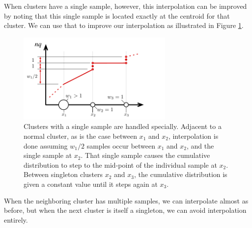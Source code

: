 \documentclass[]{statsoc}
\begin{document}
When clusters have a single sample, however, this interpolation can be improved by noting that this single sample is located exactly at the centroid for that cluster. We can use that to improve our interpolation as illustrated in Figure \ref{fig:singletons}. 
\begin{figure}[tb] %
   \centering
   \includegraphics[width=3in]{quantile-figures/singleton.pdf} 
   \caption{Clusters with a single sample are handled specially. Adjacent to a normal cluster, as is the case between $x_1$ and $x_2$, interpolation is done assuming $w_1/2$ samples occur between $x_1$ and $x_2$, and the single sample at $x_2$. That single sample causes the cumulative distribution to step to the mid-point of the individual sample at $x_2$. Between singleton clusters $x_2$ and $x_3$, the cumulative distribution is given a constant value until it steps again at $x_3$.}
   \label{fig:singletons}
\end{figure}
When the neighboring cluster has multiple samples, we can interpolate almost as before, but when the next cluster is itself a singleton, we can avoid interpolation entirely. 
\end{document}
